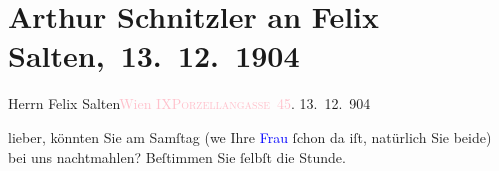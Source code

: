 

\renewcommand{\erwaehntePersonen}{Personen: Carl Hochsinger, Felix Salten, Ottilie Salten}
\renewcommand{\erwaehnteInstitutionen}{Institutionen: Erstes öffentliches Kinderkrankeninstitut}
\renewcommand{\erwaehnteOrte}{Orte: Carl-Theater, IX., Alsergrund, Porzellangasse, VIII., Josefstadt, Wien}
\renewcommand{\erwaehnteWerke}{Werke: Artur Schnitzler-Abend, Die Zeit}
\section[ Arthur Schnitzler an Felix Salten, 13. 12. 1904]{Arthur Schnitzler an Felix Salten, 13. 12. 1904}
\nopagebreak{}
\rehead{ }\normalsize\beginnumbering{}
\toendnotes[C]{\smallbreak\pagebreak[2]}
\toendnotes[C]{\smallbreak}\pstart{}{\pb}Herrn Felix Salten\pend{}\pstart{}\textcolor{pink}{Wien IX}{}\ledrightnote{\textcolor{pink}{IX., Alsergrund}}\pend{}\pstart{}\textsc{\textcolor{pink}{Porzellangasse 45}{}\ledrightnote{\textcolor{pink}{Porzellangasse}}.}\pend{}
{\bigskip}
\pstart
           \raggedleft{}{\pb}13. 12. 904\pend
           
\pstart
           lieber, könnten Sie am Samſtag (we{\geminationn} Ihre \textcolor{blue}{Frau}{}\ledrightnote{{$\rightarrow$}\textcolor{blue}{Ottilie Salten}} ſchon da iſt, natürlich Sie beide) bei uns
               nachtmahlen? Beſtimmen Sie ſelbſt die Stunde.\pend
           
